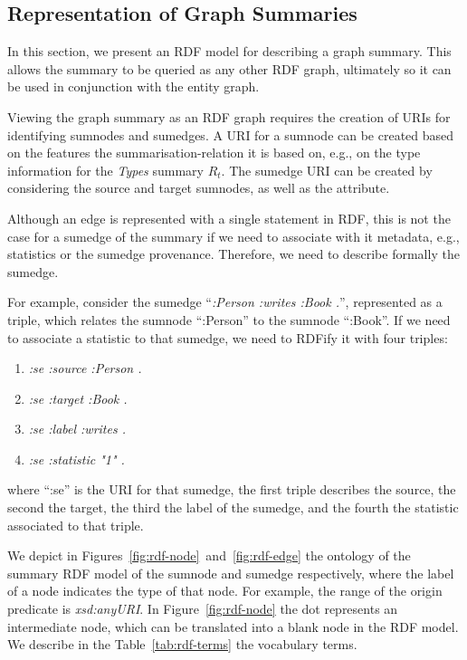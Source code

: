 \subsection{Representation of Graph Summaries}
\label{chap7:applications:wdm:summary-rdf}

In this section, we present an RDF model for describing a graph summary. This allows the summary to be queried as any other RDF graph, ultimately so it can be used in conjunction with the entity graph.

Viewing the graph summary as an RDF graph requires the creation of URIs for identifying sumnodes and sumedges. A URI for a sumnode can be created based on the features the \gls{summarisation-relation} it is based on, e.g., on the type information for the \emph{Types} summary $R_t$. The sumedge URI can be created by considering the source and target sumnodes, as well as the attribute.

\begin{remark}
	Although an edge is represented with a single statement in RDF, this is not the case for a sumedge of the summary if we need to associate with it metadata, e.g., statistics or the sumedge provenance. Therefore, we need to describe formally the sumedge.

	For example, consider the sumedge ``\emph{:Person :writes :Book .}'', represented as a triple, which relates the sumnode ``:Person'' to the sumnode ``:Book''. If we need to associate a statistic to that sumedge, we need to RDFify it with four triples:
	\begin{enumerate}
		\item \emph{:se :source :Person .}
		\item \emph{:se :target :Book .}
		\item \emph{:se :label :writes .}
		\item \emph{:se :statistic "1" .}
	\end{enumerate}
	where ``:se'' is the URI for that sumedge, the first triple describes the source, the second the target, the third the label of the sumedge, and the fourth the statistic associated to that triple.
\end{remark}

We depict in Figures~\ref{fig:rdf-node}~and~\ref{fig:rdf-edge} the ontology of the summary RDF model of the sumnode and sumedge respectively, where the label of a node indicates the type of that node. For example, the range of the origin predicate is \emph{xsd:anyURI}. In Figure~\ref{fig:rdf-node} the dot represents an intermediate node, which can be translated into a blank node in the RDF model. We describe in the Table~\ref{tab:rdf-terms} the vocabulary terms.\\

